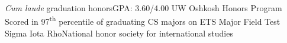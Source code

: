 \cvitemwithcomment{}
    {\listitemsymbol\textit{Cum laude} graduation honors}{GPA: 3.60/4.00}
\cvitem{}
    {\listitemsymbol UW Oshkosh Honors Program}
\cvitem{}
    {\listitemsymbol Scored in 97\textsuperscript{th} percentile of graduating CS majors on ETS Major Field Test}
\cvitemwithcomment{}
    {\listitemsymbol Sigma Iota Rho}{National honor society for international studies}